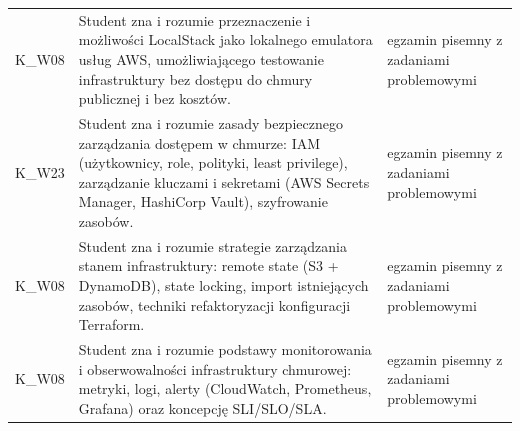 \documentclass[12pt, a4paper]{article}
\begin{document}
{\begin{longtable}{m{1.6cm}m{9.0cm}m{4.2cm}}
  \rowcolor{tableRowLight} K\_W08 & Student zna i rozumie przeznaczenie i możliwości LocalStack jako lokalnego emulatora usług AWS, umożliwiającego testowanie infrastruktury bez dostępu do chmury publicznej i bez kosztów. & egzamin pisemny z zadaniami problemowymi \\
  \rowcolor{tableRowAlt} K\_W23 & Student zna i rozumie zasady bezpiecznego zarządzania dostępem w chmurze: IAM (użytkownicy, role, polityki, least privilege), zarządzanie kluczami i sekretami (AWS Secrets Manager, HashiCorp Vault), szyfrowanie zasobów. & egzamin pisemny z zadaniami problemowymi \\
  \rowcolor{tableRowLight} K\_W08 & Student zna i rozumie strategie zarządzania stanem infrastruktury: remote state (S3 + DynamoDB), state locking, import istniejących zasobów, techniki refaktoryzacji konfiguracji Terraform. & egzamin pisemny z zadaniami problemowymi \\
  \rowcolor{tableRowAlt} K\_W08 & Student zna i rozumie podstawy monitorowania i obserwowalności infrastruktury chmurowej: metryki, logi, alerty (CloudWatch, Prometheus, Grafana) oraz koncepcję SLI/SLO/SLA. & egzamin pisemny z zadaniami problemowymi \\
\bottomrule
\end{longtable}}
\end{document}
